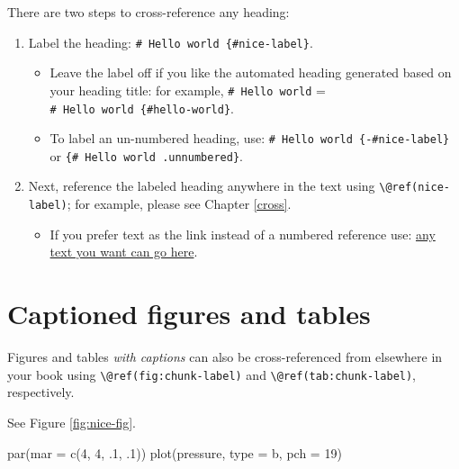 \documentclass[
]{book}
\newenvironment{Shaded}{\begin{snugshade}}{\end{snugshade}}
\newcommand{\AttributeTok}[1]{\textcolor[rgb]{0.77,0.63,0.00}{#1}}
\newcommand{\DecValTok}[1]{\textcolor[rgb]{0.00,0.00,0.81}{#1}}
\newcommand{\FunctionTok}[1]{\textcolor[rgb]{0.00,0.00,0.00}{#1}}
\newcommand{\NormalTok}[1]{#1}
\newcommand{\StringTok}[1]{\textcolor[rgb]{0.31,0.60,0.02}{#1}}
\providecommand{\tightlist}{%
  \setlength{\itemsep}{0pt}\setlength{\parskip}{0pt}}
\theoremstyle{definition}
\theoremstyle{definition}
\theoremstyle{definition}
\theoremstyle{definition}
\theoremstyle{remark}
\begin{document}
There are two steps to cross-reference any heading:

\begin{enumerate}
\def\labelenumi{\arabic{enumi}.}
\tightlist
\item
  Label the heading: \texttt{\#\ Hello\ world\ \{\#nice-label\}}.

  \begin{itemize}
  \tightlist
  \item
    Leave the label off if you like the automated heading generated based on your heading title: for example, \texttt{\#\ Hello\ world} = \texttt{\#\ Hello\ world\ \{\#hello-world\}}.
  \item
    To label an un-numbered heading, use: \texttt{\#\ Hello\ world\ \{-\#nice-label\}} or \texttt{\{\#\ Hello\ world\ .unnumbered\}}.
  \end{itemize}
\item
  Next, reference the labeled heading anywhere in the text using \texttt{\textbackslash{}@ref(nice-label)}; for example, please see Chapter \ref{cross}.

  \begin{itemize}
  \tightlist
  \item
    If you prefer text as the link instead of a numbered reference use: \protect\hyperlink{cross}{any text you want can go here}.
  \end{itemize}
\end{enumerate}

\hypertarget{captioned-figures-and-tables}{%
\section{Captioned figures and tables}\label{captioned-figures-and-tables}}

Figures and tables \emph{with captions} can also be cross-referenced from elsewhere in your book using \texttt{\textbackslash{}@ref(fig:chunk-label)} and \texttt{\textbackslash{}@ref(tab:chunk-label)}, respectively.

See Figure \ref{fig:nice-fig}.

\begin{Shaded}
\begin{Highlighting}[]
\FunctionTok{par}\NormalTok{(}\AttributeTok{mar =} \FunctionTok{c}\NormalTok{(}\DecValTok{4}\NormalTok{, }\DecValTok{4}\NormalTok{, .}\DecValTok{1}\NormalTok{, .}\DecValTok{1}\NormalTok{))}
\FunctionTok{plot}\NormalTok{(pressure, }\AttributeTok{type =} \StringTok{\textquotesingle{}b\textquotesingle{}}\NormalTok{, }\AttributeTok{pch =} \DecValTok{19}\NormalTok{)}
\end{Highlighting}
\end{Shaded}
\end{document}
